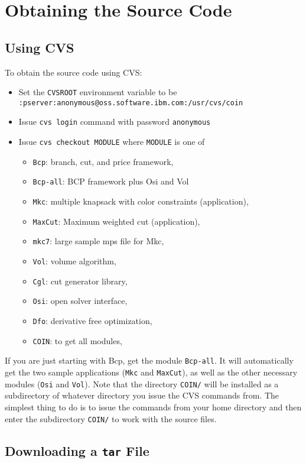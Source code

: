 \section{Obtaining the Source Code}

\subsection{Using CVS}

To obtain the source code using CVS: 
\begin{itemize}
\item Set the {\tt CVSROOT} environment variable to be \\
{\tt :pserver:anonymous@oss.software.ibm.com:/usr/cvs/coin}
\item Issue {\tt cvs login} command with password {\tt anonymous} 
\item Issue {\tt cvs checkout MODULE} where {\tt MODULE} is one of
\begin{itemize}
\item {\tt Bcp}: branch, cut, and price framework,
\item {\tt Bcp-all}: BCP framework plus Osi and Vol
\item {\tt Mkc}: multiple knapsack with color constraints (application),
\item {\tt MaxCut}: Maximum weighted cut (application),
\item {\tt mkc7}: large sample mps file for Mkc, 
\item {\tt Vol}: volume algorithm, 
\item {\tt Cgl}: cut generator library,
\item {\tt Osi}: open solver interface, 
\item {\tt Dfo}: derivative free optimization,
\item {\tt COIN}: to get all modules,
\end{itemize}
\end{itemize}

If you are just starting with Bcp, get the module {\tt Bcp-all}. It will
automatically get the two sample applications ({\tt Mkc} and {\tt MaxCut}),
as well as the other necessary modules ({\tt Osi} and {\tt Vol}). Note that
the directory {\tt COIN/} will be installed as a subdirectory of
whatever directory you issue the CVS commands from. The simplest thing
to do is to issue the commands from your home directory and then enter
the subdirectory {\tt COIN/} to work with the source files.

\subsection{Downloading a {\tt tar} File}

